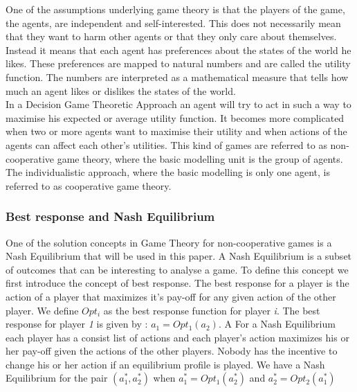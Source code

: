 One of the assumptions underlying game theory is that the players of the game, the agents, are independent and self-interested. This does not necessarily mean that they want to harm other agents or that they only care about themselves. 
Instead it means that each agent has preferences about the states of the world he likes. These preferences are mapped to natural numbers and are called the utility function. The numbers are interpreted as a mathematical measure that tells how much an agent likes or dislikes the states of the world. \\
In a Decision Game Theoretic Approach an agent will try to act in such a way to maximise his expected or average utility function. It becomes more complicated when two or more agents want to maximise their utility and when actions of the agents can affect each other's utilities. This kind of games are referred to as non-cooperative game theory, where the basic modelling unit is the group of agents. The individualistic approach, where the basic modelling is only one agent, is referred to as cooperative game theory. 

 


\subsubsection{Best response and Nash Equilibrium}
One of the solution concepts in Game Theory for non-cooperative games is a Nash Equilibrium that will be used in this paper. A Nash Equilibrium is a subset of outcomes that can be interesting to analyse a game. To define this concept we first introduce the concept of best response. The best response for a player is the action of a player that maximizes it's pay-off for any given action of the other player. We define $Opt_{i}$ as the best response function for player \textit{i}. The best response for player \textit{1} is given by : $a_{1} = Opt_{1}(a_{2})$. A 
For a Nash Equilibrium each player has a consist list of actions and each player's action maximizes his or her pay-off given the actions of the other players. Nobody has the incentive to change his or her action if an equilibrium profile is played. We have a Nash Equilibrium for the pair $(a_{1}^{*},a_{2}^{*})$ when $a_{1}^{*} = Opt_{1}(a_{2}^{*})$ and $a_{2}^{*} = Opt_{2}(a_{1}^{*})$\\


